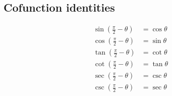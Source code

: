 \subsection*{Cofunction identities}

\begin{align*}
  \sin(\frac{\pi}{2} - \theta) &= \cos \theta\\
  \cos(\frac{\pi}{2} - \theta) &= \sin \theta\\
  \tan(\frac{\pi}{2} - \theta) &= \cot \theta\\
  \cot(\frac{\pi}{2} - \theta) &= \tan \theta\\
  \sec(\frac{\pi}{2} - \theta) &= \csc \theta\\
  \csc(\frac{\pi}{2} - \theta) &= \sec \theta
\end{align*}